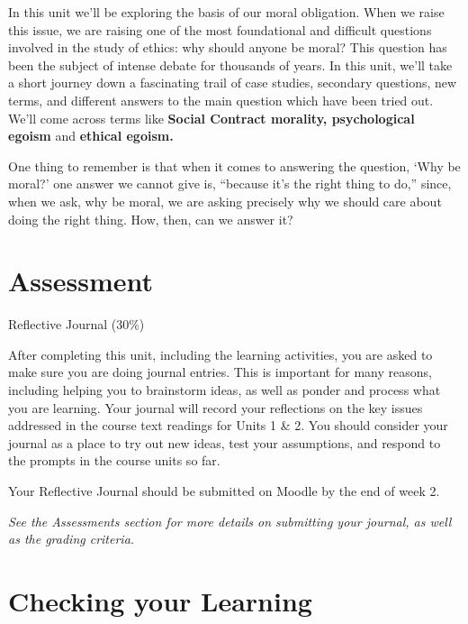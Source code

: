\documentclass[
]{book}
\begin{document}
In this unit we'll be exploring the basis of our moral obligation. When we raise this issue, we are raising one of the most foundational and difficult questions involved in the study of ethics: why should anyone be moral? This question has been the subject of intense debate for thousands of years. In this unit, we'll take a short journey down a fascinating trail of case studies, secondary questions, new terms, and different answers to the main question which have been tried out. We'll come across terms like \textbf{Social Contract morality, psychological egoism} and \textbf{ethical egoism.}

One thing to remember is that when it comes to answering the question, `Why be moral?' one answer we cannot give is, ``because it's the right thing to do,'' since, when we ask, why be moral, we are asking precisely why we should care about doing the right thing. How, then, can we answer it?

\hypertarget{assessment-3}{%
\section*{Assessment}\label{assessment-3}}

\begin{assessment}
{Reflective Journal (30\%)}

After completing this unit, including the learning activities, you are asked to make sure you are doing journal entries. This is important for many reasons, including helping you to brainstorm ideas, as well as ponder and process what you are learning. Your journal will record your reflections on the key issues addressed in the course text readings for Units 1 \& 2. You should consider your journal as a place to try out new ideas, test your assumptions, and respond to the prompts in the course units so far.

Your Reflective Journal should be submitted on Moodle by the end of week 2.

\emph{See the Assessments section for more details on submitting your journal, as well as the grading criteria.}
\end{assessment}

\hypertarget{checking-your-learning-1}{%
\section*{Checking your Learning}\label{checking-your-learning-1}}
\end{document}
